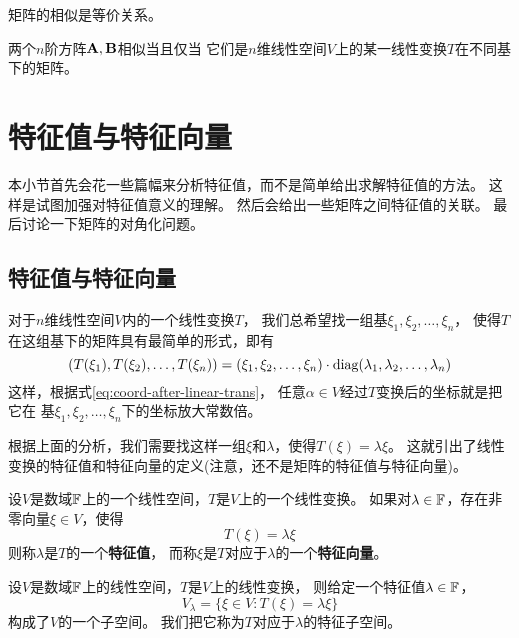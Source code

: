 \begin{remark}
  矩阵的相似是等价关系。
\end{remark}

\begin{theorem}[矩阵相似的等价条件] \label{thrm:mat-sim-equiv-cond}
  两个$n$阶方阵$\mathbf{A},\mathbf{B}$相似当且仅当
  它们是$n$维线性空间$V$上的某一线性变换$T$在不同基下的矩阵。
\end{theorem}

\section{特征值与特征向量}
本小节首先会花一些篇幅来分析特征值，而不是简单给出求解特征值的方法。
这样是试图加强对特征值意义的理解。
然后会给出一些矩阵之间特征值的关联。
最后讨论一下矩阵的对角化问题。

\subsection{特征值与特征向量}
对于$n$维线性空间$V$内的一个线性变换$T$，
我们总希望找一组基$\xi_1,\xi_2,\dots,\xi_n$，
使得$T$在这组基下的矩阵具有最简单的形式，即有
\begin{equation} \label{eq:diagonalizable}
  (T(\xi_1), T(\xi_2),\dots,T(\xi_n)) = (\xi_1,\xi_2,\dots,\xi_n)
    \cdot \textrm{diag}(\lambda_1,\lambda_2,\dots,\lambda_n)
\end{equation}
这样，根据式\eqref{eq:coord-after-linear-trans}，
任意$\alpha\in V$经过$T$变换后的坐标就是把它在
基$\xi_1,\xi_2,\dots,\xi_n$下的坐标放大常数倍。

根据上面的分析，我们需要找这样一组$\xi$和$\lambda$，使得$T(\xi) = \lambda\xi$。
这就引出了线性变换的特征值和特征向量的定义(注意，还不是矩阵的特征值与特征向量)。

\begin{definition}[线性变换的特征值和特征向量]
  设$V$是数域$\mathbb{F}$上的一个线性空间，$T$是$V$上的一个线性变换。
  如果对$\lambda\in\mathbb{F}$，存在非零向量$\xi\in V$，使得
  \[ T(\xi) = \lambda\xi \]
  则称$\lambda$是$T$的一个\textbf{特征值}，
  而称$\xi$是$T$对应于$\lambda$的一个\textbf{特征向量}。
\end{definition}

\begin{theorem}[特征子空间]
  设$V$是数域$\mathbb{F}$上的线性空间，$T$是$V$上的线性变换，
  则给定一个特征值$\lambda\in\mathbb{F}$，
  \begin{displaymath}
    V_\lambda = \{ \xi\in V: T(\xi)=\lambda\xi \}
  \end{displaymath}
  构成了$V$的一个子空间。
  我们把它称为$T$对应于$\lambda$的特征子空间。
\end{theorem}

